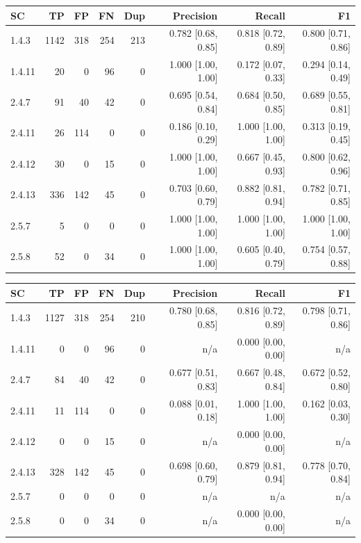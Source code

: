 \begin{tabular}{lrrrrrrr}
\hline
SC & TP & FP & FN & Dup & Precision & Recall & F1 \\
\hline
1.4.3 & 1142 & 318 & 254 & 213 & 0.782 [0.68, 0.85] & 0.818 [0.72, 0.89] & 0.800 [0.71, 0.86] \\
1.4.11 & 20 & 0 & 96 & 0 & 1.000 [1.00, 1.00] & 0.172 [0.07, 0.33] & 0.294 [0.14, 0.49] \\
2.4.7 & 91 & 40 & 42 & 0 & 0.695 [0.54, 0.84] & 0.684 [0.50, 0.85] & 0.689 [0.55, 0.81] \\
2.4.11 & 26 & 114 & 0 & 0 & 0.186 [0.10, 0.29] & 1.000 [1.00, 1.00] & 0.313 [0.19, 0.45] \\
2.4.12 & 30 & 0 & 15 & 0 & 1.000 [1.00, 1.00] & 0.667 [0.45, 0.93] & 0.800 [0.62, 0.96] \\
2.4.13 & 336 & 142 & 45 & 0 & 0.703 [0.60, 0.79] & 0.882 [0.81, 0.94] & 0.782 [0.71, 0.85] \\
2.5.7 & 5 & 0 & 0 & 0 & 1.000 [1.00, 1.00] & 1.000 [1.00, 1.00] & 1.000 [1.00, 1.00] \\
2.5.8 & 52 & 0 & 34 & 0 & 1.000 [1.00, 1.00] & 0.605 [0.40, 0.79] & 0.754 [0.57, 0.88] \\
\hline
\end{tabular}

\begin{tabular}{lrrrrrrr}
\hline
SC & TP & FP & FN & Dup & Precision & Recall & F1 \\
\hline
1.4.3 & 1127 & 318 & 254 & 210 & 0.780 [0.68, 0.85] & 0.816 [0.72, 0.89] & 0.798 [0.71, 0.86] \\
1.4.11 & 0 & 0 & 96 & 0 & n/a & 0.000 [0.00, 0.00] & n/a \\
2.4.7 & 84 & 40 & 42 & 0 & 0.677 [0.51, 0.83] & 0.667 [0.48, 0.84] & 0.672 [0.52, 0.80] \\
2.4.11 & 11 & 114 & 0 & 0 & 0.088 [0.01, 0.18] & 1.000 [1.00, 1.00] & 0.162 [0.03, 0.30] \\
2.4.12 & 0 & 0 & 15 & 0 & n/a & 0.000 [0.00, 0.00] & n/a \\
2.4.13 & 328 & 142 & 45 & 0 & 0.698 [0.60, 0.79] & 0.879 [0.81, 0.94] & 0.778 [0.70, 0.84] \\
2.5.7 & 0 & 0 & 0 & 0 & n/a & n/a & n/a \\
2.5.8 & 0 & 0 & 34 & 0 & n/a & 0.000 [0.00, 0.00] & n/a \\
\hline
\end{tabular}

